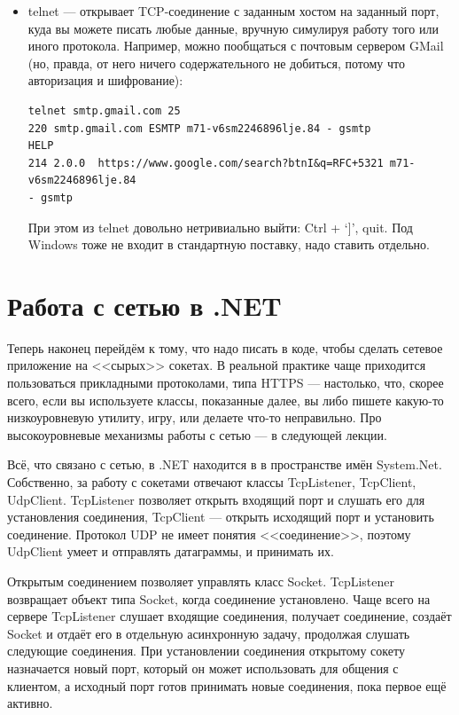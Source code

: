 \documentclass[a5paper]{article}
\begin{document}
\begin{itemize}
    \item telnet --- открывает TCP-соединение с заданным хостом на заданный порт, куда вы можете писать любые данные, вручную симулируя работу того или иного протокола. Например, можно пообщаться с почтовым сервером GMail (но, правда, от него ничего содержательного не добиться, потому что авторизация и шифрование):
        \begin{verbatim}
telnet smtp.gmail.com 25
220 smtp.gmail.com ESMTP m71-v6sm2246896lje.84 - gsmtp
HELP
214 2.0.0  https://www.google.com/search?btnI&q=RFC+5321 m71-v6sm2246896lje.84 
- gsmtp
        \end{verbatim}
        При этом из telnet довольно нетривиально выйти: Ctrl + `]', quit. Под Windows тоже не входит в стандартную поставку, надо ставить отдельно.
\end{itemize}

\section{Работа с сетью в .NET}

Теперь наконец перейдём к тому, что надо писать в коде, чтобы сделать сетевое приложение на <<сырых>> сокетах. В реальной практике чаще приходится пользоваться прикладными протоколами, типа HTTPS --- настолько, что, скорее всего, если вы используете классы, показанные далее, вы либо пишете какую-то низкоуровневую утилиту, игру, или делаете что-то неправильно. Про высокоуровневые механизмы работы с сетью --- в следующей лекции.

Всё, что связано с сетью, в .NET находится в в пространстве имён System.Net. Собственно, за работу с сокетами отвечают классы TcpListener, TcpClient, UdpClient. TcpListener позволяет открыть входящий порт и слушать его для установления соединения, TcpClient --- открыть исходящий порт и установить соединение. Протокол UDP не имеет понятия <<соединение>>, поэтому UdpClient умеет и отправлять датаграммы, и принимать их.

Открытым соединением позволяет управлять класс Socket. TcpListener возвращает объект типа Socket, когда соединение установлено. Чаще всего на сервере TcpListener слушает входящие соединения, получает соединение, создаёт Socket и отдаёт его в отдельную асинхронную задачу, продолжая слушать следующие соединения. При установлении соединения открытому сокету назначается новый порт, который он может использовать для общения с клиентом, а исходный порт готов принимать новые соединения, пока первое ещё активно.
\end{document}
